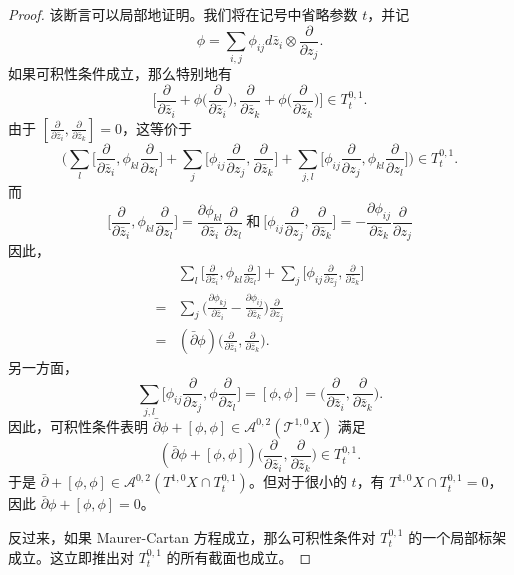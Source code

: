 \begin{proof}
    该断言可以局部地证明。我们将在记号中省略参数 $t$，并记\[
        \phi=\sum_{i,j}\phi_{ij}d\bar{z}_i\otimes \frac{\partial}{\partial z_j}.
    \]如果可积性条件成立，那么特别地有\[
        \bigg[\frac{\partial}{\partial \bar{z}_i}+\phi\bigg(\frac{\partial}{\partial \bar{z}_i}\bigg),\frac{\partial}{\partial \bar{z}_k}+\phi\bigg(\frac{\partial}{\partial\bar{z}_k}\bigg)\bigg]\in T^{0,1}_t.
    \]由于 $[\frac{\partial}{\partial \bar{z}_i},\frac{\partial}{\partial \bar{z}_k}]=0$，这等价于\[
        \biggl(\sum_l \bigg[\frac{\partial}{\partial \bar{z}_i},\phi_{kl}\frac{\partial}{\partial z_l}\bigg]+\sum_j\bigg[\phi_{ij}\frac{\partial}{\partial z_j},\frac{\partial}{\partial\bar{z}_k}\bigg]+\sum_{j,l}\bigg[\phi_{ij}\frac{\partial}{\partial z_j},\phi_{kl}\frac{\partial}{\partial z_l}\bigg] \biggr)\in T^{0,1}_t.
    \]而\[
        \bigg[\frac{\partial}{\partial\bar{z}_i},\phi_{kl}\frac{\partial}{\partial z_l}\bigg]=\frac{\partial \phi_{kl}}{\partial\bar{z}_i}\frac{\partial}{\partial z_l}\ \text{和}\ \bigg[\phi_{ij}\frac{\partial}{\partial z_j},\frac{\partial}{\partial\bar{z}_k}\bigg]=-\frac{\partial\phi_{ij}}{\partial \bar{z}_k}\frac{\partial}{\partial z_j}
    \]因此，\begin{align*}
        &\sum_l\bigg[\frac{\partial}{\partial\bar{z}_i},\phi_{kl}\frac{\partial}{\partial z_l}\bigg]+\sum_j\bigg[\phi_{ij}\frac{\partial}{\partial z_j},\frac{\partial}{\partial \bar{z}_k}\bigg]\\
        =&\sum_{j}\bigg(\frac{\partial\phi_{kj}}{\partial \bar{z}_i}-\frac{\partial\phi_{ij}}{\partial\bar{z}_k}\bigg)\frac{\partial}{\partial z_j}\\
        =&(\bar{\partial}\phi)\bigg(\frac{\partial}{\partial\bar{z}_i},\frac{\partial}{\partial\bar{z}_k}\bigg).
    \end{align*}另一方面，\[
        \sum_{j,l}\bigg[\phi_{ij}\frac{\partial}{\partial z_j},\phi\frac{\partial}{\partial z_l}\bigg]=[\phi,\phi]=\bigg(\frac{\partial}{\partial \bar{z}_i},\frac{\partial}{\partial\bar{z}_k}\bigg).
    \]因此，可积性条件表明 $\bar{\partial}\phi+[\phi,\phi]\in\mathcal{A}^{0,2}(\mathcal{T}^{1,0}X)$ 满足\[
        (\bar{\partial}\phi+[\phi,\phi])\bigg(\frac{\partial}{\partial\bar{z}_i},\frac{\partial}{\partial\bar{z}_k}\bigg)\in T^{0,1}_t.
    \]于是 $\bar{\partial}+[\phi,\phi]\in\mathcal{A}^{0,2}(T^{1,0}X\cap T^{0,1}_t)$。但对于很小的 $t$，有 $T^{1,0}X\cap T^{0,1}_t =0$，因此 $\bar{\partial}\phi+[\phi,\phi]=0$。

    反过来，如果 Maurer-Cartan 方程成立，那么可积性条件对 $T^{0,1}_t$ 的一个局部标架成立。这立即推出对 $T^{0,1}_t$ 的所有截面也成立。
\end{proof}

